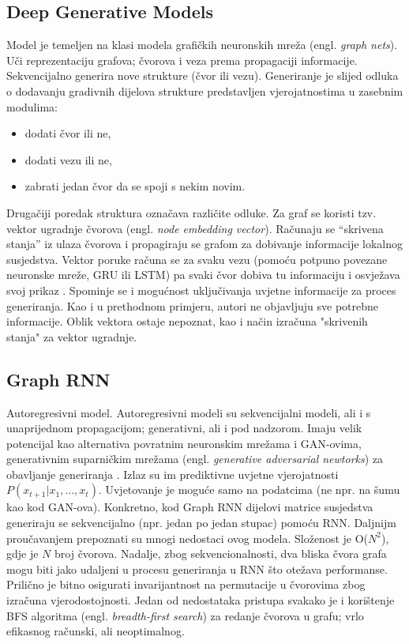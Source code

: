 \documentclass[times, utf8,projekt]{fer}
\begin{document}
\subsection{Deep Generative Models}
Model je temeljen na klasi modela grafičkih neuronskih mreža (engl. \textit{graph nets}). Uči reprezentaciju grafova; čvorova i veza prema propagaciji informacije. Sekvencijalno generira nove strukture (čvor ili vezu). Generiranje je slijed odluka o dodavanju gradivnih dijelova strukture predstavljen vjerojatnostima u zasebnim modulima:
\begin{itemize}
	\item{dodati čvor ili ne,}
	\item{dodati vezu ili ne,}
	\item{zabrati jedan čvor da se spoji s nekim novim.}
\end{itemize}
Drugačiji poredak struktura označava različite odluke.
Za graf se koristi tzv. vektor ugradnje čvorova (engl. \textit{node embedding vector}). Računaju se “skrivena stanja” iz ulaza čvorova i propagiraju se grafom za dobivanje informacije lokalnog susjedstva. Vektor poruke računa se za svaku vezu (pomoću potpuno povezane neuronske mreže, GRU ili LSTM) pa svaki čvor dobiva tu informaciju i osvježava svoj prikaz \citep{ct3}.
Spominje se i mogućnost uključivanja uvjetne informacije za proces generiranja. Kao i u prethodnom primjeru, autori ne objavljuju sve potrebne informacije. Oblik vektora ostaje nepoznat, kao i način izračuna "skrivenih stanja" za vektor ugradnje.\newline
\newline
\subsection{Graph RNN}
Autoregresivni model. Autoregresivni modeli su sekvencijalni modeli, ali i s unaprijednom propagacijom; generativni, ali i pod nadzorom. Imaju velik potencijal kao alternativa povratnim neuronskim mrežama i GAN-ovima, generativnim suparničkim mrežama (engl. \textit{generative adversarial newtorks}) za obavljanje generiranja \cite{ct4}. Izlaz su im prediktivne uvjetne vjerojatnosti $P(x_{t+1} | x_1, …, x_t)$. Uvjetovanje je moguće samo na podatcima (ne npr. na šumu kao kod GAN-ova).
Konkretno, kod Graph RNN dijelovi matrice susjedstva generiraju se sekvencijalno (npr. jedan po jedan stupac) pomoću RNN.
Daljnijm proučavanjem prepoznati su mnogi nedostaci ovog modela. Složenost je O($N^2$), gdje je $N$ broj čvorova. Nadalje, zbog sekvencionalnosti, dva bliska čvora grafa mogu biti jako udaljeni u procesu generiranja u RNN što otežava performanse. Prilično je bitno osigurati invarijantnost na permutacije u čvorovima zbog izračuna vjerodostojnosti. Jedan od nedostataka pristupa svakako je i korištenje BFS algoritma (engl. \textit{breadth-first search}) za redanje čvorova u grafu; vrlo efikasnog računski, ali neoptimalnog.\newline
\newline
\end{document}
